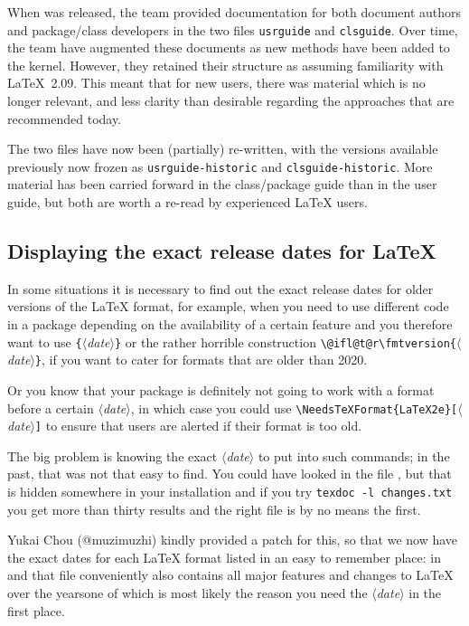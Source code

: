 \documentclass{ltnews}
\providecommand\Dash {\unskip \textemdash}
\providecommand\meta[1]{$\langle$\textrm{\itshape#1}$\rangle$}
\begin{document}
When \LaTeXe{} was released, the team provided documentation for both document
authors and package/class developers in the two files \texttt{usrguide} and
\texttt{clsguide}. Over time, the team have augmented these documents as new
methods have been added to the kernel. However, they retained their structure
as assuming familiarity with \LaTeX{}~2.09. This meant that for new users,
there was material which is no longer relevant, and less clarity than desirable
regarding the approaches that are recommended today.

The two files have now been (partially) re-written, with the versions available
previously now frozen as \texttt{usrguide-historic} and \texttt{clsguide-historic}.
More material has been carried forward in the class/package guide than in the
user guide, but both are worth a re-read by experienced \LaTeX{} users.



\subsection{Displaying the exact release dates for \LaTeX{}}

In some situations it is necessary to find out the exact release dates
for older versions of the \LaTeX{} format, for example, when you need
to use different code in a package depending on the availability of a
certain feature and you therefore want to use
\texttt\{\meta{date}\texttt\} or the
rather horrible construction \verb/\@ifl@t@r\fmtversion{/\meta{date}\texttt\},
if you
want to cater for formats that are older than 2020.

Or you know that your package is definitely not going to work with a
format before a certain \meta{date}, in which case you could use
\verb/\NeedsTeXFormat{LaTeX2e}[/\meta{date}\texttt] to ensure that
users are alerted if their format is too old.

The big problem is knowing the exact \meta{date} to put into such
commands; in the past, that was not that easy to find. You could have 
looked in the file , but that is hidden somewhere
in your installation and if you try
\verb/texdoc -l changes.txt/ you get more than thirty results and the %
right file is by no means the first.

Yukai Chou (\textsf{@muzimuzhi}) kindly provided a patch for this, so that we now have
the exact dates for each \LaTeX{} format listed in an easy to remember
place: in  and that file conveniently also contains all major
features and changes to \LaTeX{} over the years\Dash one of which is
most likely the reason you need the \meta{date} in the first
place.
\end{document}
